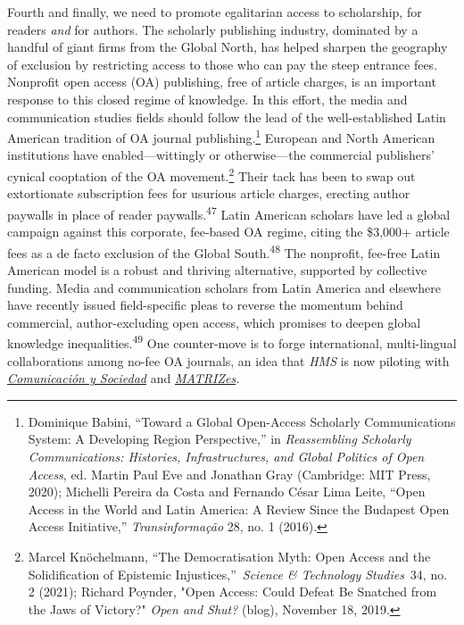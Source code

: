 \documentclass{tufte-handout}
\begin{document}
Fourth and finally, we need to promote egalitarian access to
scholarship, for readers \emph{and} for authors. The scholarly
publishing industry, dominated by a handful of giant firms from the
Global North, has helped sharpen the geography of exclusion by
restricting access to those who can pay the steep entrance fees.
Nonprofit open access (OA) publishing, free of article charges, is an
important response to this closed regime of knowledge. In this effort,
the media and communication studies fields should follow the lead of the
well-established Latin American tradition of OA journal
publishing.\footnote{Dominique Babini, ``Toward a Global Open-Access
  Scholarly Communications System: A Developing Region Perspective,'' in
  \emph{Reassembling Scholarly Communications: Histories,
  Infrastructures, and Global Politics of Open Access}, ed. Martin Paul
  Eve and Jonathan Gray (Cambridge: MIT Press, 2020); Michelli Pereira
  da Costa and Fernando César Lima Leite, ``Open Access in the World and
  Latin America: A Review Since the Budapest Open Access Initiative,''
  \emph{Transinformação} 28, no. 1 (2016).} European and North American
institutions have enabled---wittingly or otherwise---the commercial
publishers' cynical cooptation of the OA movement.\footnote{Marcel
  Knöchelmann, ``The Democratisation Myth: Open Access and the
  Solidification of Epistemic Injustices,''~\emph{Science \& Technology
  Studies}~34, no. 2 (2021); Richard Poynder, "Open Access: Could Defeat
  Be Snatched from the Jaws of Victory?" \emph{Open and Shut?} (blog),
  November 18, 2019.} Their tack has been to swap out extortionate
subscription fees for usurious article charges, erecting author paywalls
in place of reader paywalls.\textsuperscript{47} Latin American scholars have led a global campaign
against this corporate, fee-based OA regime, citing the \$3,000+ article
fees as a de facto exclusion of the Global South.\textsuperscript{48} The nonprofit, fee-free Latin American model is a robust and
thriving alternative, supported by collective funding. Media and
communication scholars from Latin America and elsewhere have recently
issued field-specific pleas to reverse the momentum behind commercial,
author-excluding open access, which promises to deepen global knowledge
inequalities.\textsuperscript{49} One counter-move is to
forge international, multi-lingual collaborations among no-fee OA
journals, an idea that \emph{HMS} is now piloting with
\href{http://www.comunicacionysociedad.cucsh.udg.mx/index.php/comsoc}{\emph{Comunicación
y Sociedad}} and
\href{https://www.revistas.usp.br/matrizes/}{\emph{MATRIZes}}\emph{.}
\end{document}
